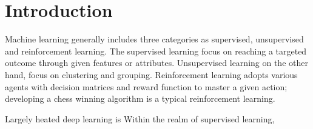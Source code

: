\section{Introduction}

Machine learning generally includes three categories as supervised, unsupervised and reinforcement learning. The supervised learning focus on reaching a targeted outcome through given features or attributes. Unsupervised learning on the other hand, focus on clustering and grouping. Reinforcement learning adopts various agents with decision matrices and reward function to master a given action; developing a chess winning algorithm is a typical reinforcement learning.
\par
Largely heated deep learning is Within the realm of supervised learning, 
